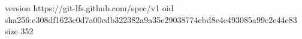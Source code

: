 version https://git-lfs.github.com/spec/v1
oid sha256:c308df1623c0d7a00cdb322382a9a35e29038774ebd8e4e493085a99c2e44e83
size 352
